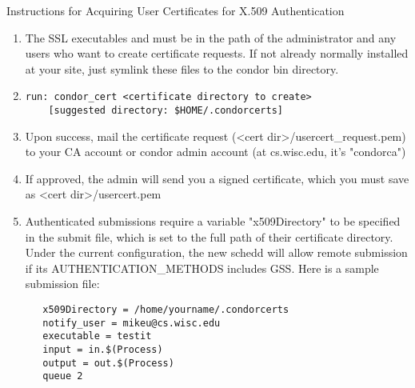 Instructions for Acquiring User Certificates for X.509 Authentication

\begin{enumerate}
\item The SSL executables  and  must be in the path of the administrator and any users who want to create certificate requests. If not already normally installed at your site, just symlink these files to the condor bin directory.

\item
\begin{verbatim}
run: condor_cert <certificate directory to create> 
	[suggested directory: $HOME/.condorcerts]
\end{verbatim}

\item Upon success, mail the certificate request (<cert dir>/usercert\_request.pem) to your CA account or condor admin account (at cs.wisc.edu, it's "condorca")

\item If approved, the admin will send you a signed certificate, which you must save as <cert dir>/usercert.pem

\item Authenticated submissions require a variable "x509Directory" to be 
specified in the submit file, which is set to the full path of their 
certificate directory.  Under the current configuration, the new schedd will 
allow remote submission if its AUTHENTICATION\_METHODS includes GSS.  Here is 
a sample submission file:
\begin{verbatim}
   x509Directory = /home/yourname/.condorcerts
   notify_user = mikeu@cs.wisc.edu
   executable = testit
   input = in.$(Process)
   output = out.$(Process)
   queue 2
\end{verbatim}
\end{enumerate}
